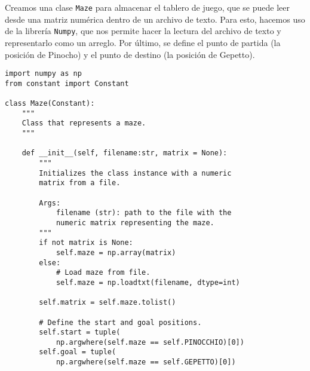 Creamos una clase \lstinline{Maze} para almacenar el tablero de juego, que se puede leer desde una matriz numérica dentro de un archivo de texto. Para esto, hacemos uso de la librería \lstinline{Numpy}, que nos permite hacer la lectura del archivo de texto y representarlo como un arreglo. Por último, se define el punto de partida (la posición de Pinocho) y el punto de destino (la posición de Gepetto).\\
\begin{lstlisting}
import numpy as np
from constant import Constant

class Maze(Constant):
    """
    Class that represents a maze.
    """

    def __init__(self, filename:str, matrix = None):
        """
        Initializes the class instance with a numeric
        matrix from a file.

        Args:
            filename (str): path to the file with the
            numeric matrix representing the maze.
        """
        if not matrix is None:
            self.maze = np.array(matrix)
        else:
            # Load maze from file.
            self.maze = np.loadtxt(filename, dtype=int)
            
        self.matrix = self.maze.tolist()

        # Define the start and goal positions.
        self.start = tuple(
            np.argwhere(self.maze == self.PINOCCHIO)[0])
        self.goal = tuple(
            np.argwhere(self.maze == self.GEPETTO)[0])
\end{lstlisting}